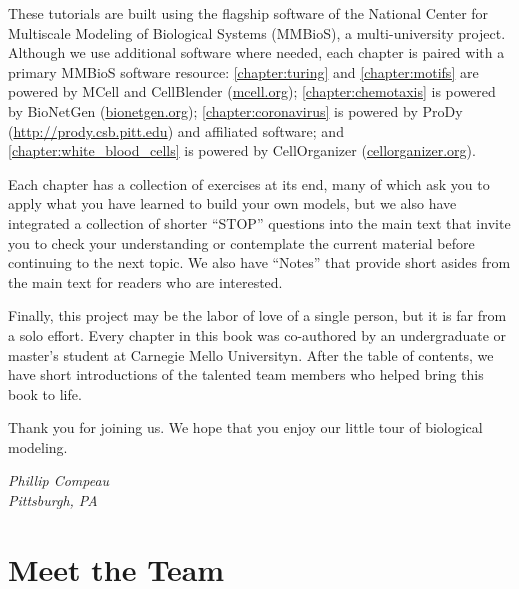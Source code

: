 These tutorials are built using the flagship software of the National Center for Multiscale Modeling of Biological Systems (MMBioS), a multi-university project. Although we use additional software where needed, each chapter is paired with a primary MMBioS software resource: \autoref{chapter:turing} and \autoref{chapter:motifs} are powered by MCell and CellBlender (\url{mcell.org}); \autoref{chapter:chemotaxis} is powered by BioNetGen (\url{bionetgen.org}); \autoref{chapter:coronavirus} is powered by ProDy (\url{http://prody.csb.pitt.edu}) and affiliated software; and \autoref{chapter:white_blood_cells} is powered by CellOrganizer (\url{cellorganizer.org}).

Each chapter has a collection of exercises at its end, many of which ask you to apply what you have learned to build your own models, but we also have integrated a collection of shorter ``STOP'' questions into the main text that invite you to check your understanding or contemplate the current material before continuing to the next topic. We also have ``Notes'' that provide short asides from the main text for readers who are interested.

Finally, this project may be the labor of love of a single person, but it is far from a solo effort. Every chapter in this book was co-authored by an undergraduate or master's student at Carnegie Mello Universityn. After the table of contents, we have short introductions of the talented team members who helped bring this book to life.

Thank you for joining us. We hope that you enjoy our little tour of biological modeling.

\begin{flushright}
\textit{Phillip Compeau}\\
\textit{Pittsburgh, PA}
\end{flushright}

\phantom{}\vspace{7.7\baselineskip}

\newpage

\tableofcontents*
\clearpage
{}


\newpage
{}
\chapter{Meet the Team}

